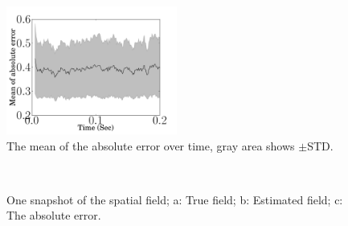 \documentclass[12pt]{iopart}
\begin{document}
  \begin{figure}
   	\begin{center}
   		\includegraphics[width=0.5\textwidth]{./Graph/MAE.pdf} 
   	\end{center}
   	\caption{The mean of the absolute error over time, gray area shows $\pm$STD.} 
\label{fig:MAE}
   \end{figure}
\begin{figure}[!th]
\centering 
{}
\\
\caption{One snapshot of the spatial field; a: True field; b: Estimated field; c: The absolute error.}
\label{fig:FieldEstimate}
\end{figure}
\end{document}
